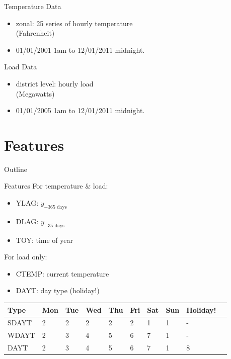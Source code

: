\documentclass{beamer}
\begin{document}
\begin{frame}{Temperature Data}
\begin{itemize}
\item zonal: 25 series of hourly temperature\\ (Fahrenheit)
\item 01/01/2001 1am to 12/01/2011 midnight.
\end{itemize}
\begin{figure}
\centering
{}
\end{figure}
\end{frame}

\begin{frame}{Load Data}
\begin{itemize}
\item district level: hourly load\\ (Megawatts)
\item 01/01/2005 1am to 12/01/2011 midnight.
\end{itemize}
\begin{figure}
\centering
{}
\end{figure}
\end{frame}

\section{Features}
\begin{frame}[noframenumbering]{Outline}
\tableofcontents[currentsection]
\end{frame}
\begin{frame}{Features}
For temperature \& load:
\begin{itemize}
\item YLAG: $y_{-365 \text{ days}}$
\item DLAG: $y_{-35 \text{ days}}$
\item TOY: time of year
\end{itemize}
\pause
For load only:
\begin{itemize}
\item CTEMP: current temperature
\item DAYT: day type (holiday!)
\end{itemize}
\pause
\begin{table}[h]
\centering
\begin{tabular}{@{}llllllllll@{}}
\toprule
 Type & Mon & Tue & Wed & Thu & Fri & Sat & Sun & \textcolor{bostonuniversityred}{Holiday!} \\ \midrule
SDAYT & 2 & 2 & 2 & 2 & 2 & 1 & 1 & - \\
WDAYT & 2 & 3 & 4 & 5 & 6 & 7 & 1 & - \\
DAYT & 2 & 3 & 4 & 5 & 6 & 7 & 1 & 8 \\ \bottomrule
\end{tabular}
\end{table}
\end{frame}
\end{document}
